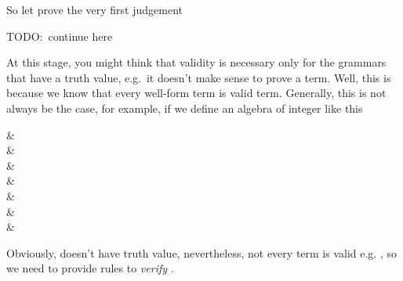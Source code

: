 \documentclass[master.tex]{subfiles}
\begin{document}
So let prove the very first judgement


TODO:\ continue here

At this stage, you might think that validity is necessary only for the
grammars that have a truth value, e.g.\ it doesn't make sense to prove a
 term. Well, this is because we know that every well-form
 term is valid term. Generally, this is not always be the
case, for example, if we define an algebra of integer like this

 {
    \kVarRegex &  \\

    \kChoice &  \\

    \kChoice &  \\

    \kChoice &  \\

    \kChoice &  \\

    \kChoice &  \\

    \kChoice &  \\
}

Obviously,  doesn't have truth value, nevertheless, not every
 term is valid e.g. , so
we need to provide rules to \emph{verify} .
\end{document}
